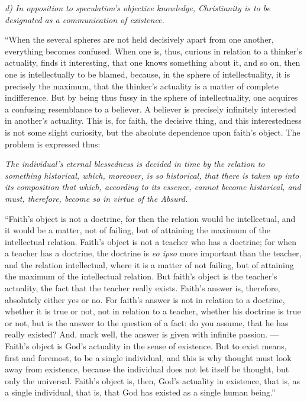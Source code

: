 \documentclass[12pt]{book}
\begin{document}
\begin{center}
\emph{d) In opposition to speculation's objective
knowledge, Christianity is to be designated as a
communication of existence.}
\end{center}

``When the several spheres are not held decisively apart from one another, everything becomes confused. When one is, thus, curious in relation to a thinker's actuality, finds it interesting, that one knows something about it, and so on, then one is intellectually to be blamed, because, in the sphere of intellectuality, it is precisely the maximum, that the thinker's actuality is a matter of complete indifference. But by being thus fussy in the sphere of intellectuality, one acquires a confusing resemblance to a believer. A believer is precisely infinitely interested in another's actuality. This is, for faith, the decisive thing, and this interestedness is not some slight curiosity, but the absolute dependence upon faith's object. The problem is expressed thus:

\emph{The individual's eternal blessedness is decided in time by the relation to something historical, which, moreover, is so historical, that there is taken up into its composition that which, according to its essence, cannot become historical, and must, therefore, become so in virtue of the Absurd.}

``Faith's object is not a doctrine, for then the relation would be intellectual, and it would be a matter, not of failing, but of attaining the maximum of the intellectual relation.
Faith's object is not a teacher who has a doctrine; for when a teacher has a doctrine, the doctrine is \textit{eo ipso} more important than the teacher, and the relation intellectual, where it is a matter of not failing, but of attaining the maximum of the intellectual relation. But faith's object is the teacher's actuality, the fact that the teacher really exists. Faith's answer is, therefore, absolutely either yes or no. For faith's answer is not in relation to a doctrine, whether it is true or not, not in relation to a teacher, whether his doctrine is true or not, but is the answer to the question of a fact: do you assume, that he has really existed? And, mark well, the answer is given with infinite passion. --- Faith's object is God's actuality in the sense of existence. But to exist means, first and foremost, to be a single individual, and this is why thought must look away from existence, because the individual does not let itself be thought, but only the universal. Faith's object is, then, God's actuality in existence, that is, as a single individual, that is, that God has existed as a single human being.''
\end{document}
